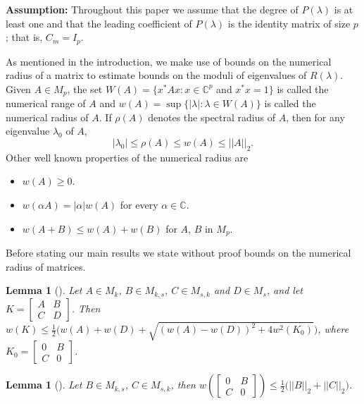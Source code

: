 \documentclass[12pt, reqno]{amsart}
\newtheorem{lemma}[theorem]{Lemma}
\theoremstyle{definition}
\theoremstyle{remark}
\numberwithin{equation}{section}
\begin{document}
\noindent 
\textbf{Assumption:} Throughout this paper we assume that the degree of 
$P(\lambda)$ is at least one and that the leading coefficient of $P(\lambda)$ is 
the identity matrix of size $p$; that is, $C_m=I_p$. 

\medskip
As mentioned in the introduction, we make use of bounds on the numerical radius of a matrix 
to estimate bounds on the moduli of eigenvalues of $R(\lambda)$. Given $A \in M_p$, the set 
$W(A) = \{ x^*Ax : x \in \mathbb{C}^p$ and  $x^*x=1\}$ is called the numerical range of 
$A$ and $w(A) = \sup \{ |\lambda| : \lambda \in W(A) \}$ is called the numerical radius 
of $A$. If $\rho(A)$ denotes the spectral radius of $A$, then for any eigenvalue $\lambda_0$ 
of $A$, 
\begin{equation}\label{numerical radius-relationship}
|\lambda_0| \leq \rho(A) \leq w(A) \leq ||A||_2.
\end{equation}
Other well known properties of the numerical radius are  
\begin{itemize}
\item $w(A) \geq 0$.
\item $w(\alpha A) = |\alpha| w(A)$ for every $\alpha \in \mathbb{C}$.
\item $w(A+B) \leq w(A)+w(B)$ for $A$, $B$ in $M_p$. 
\end{itemize}

\medskip
Before stating our main results we state without proof bounds on the numerical radius 
of matrices.

\begin{lemma}[\cite{Abu-Omar}] \label{Lem-numerical radius-1}
Let $A \in M_k$, $B \in M_{k,s}$, $C \in M_{s,k}$ and $D \in M_{s}$, and 
let $K = \begin{bmatrix}
A & B \\
C & D
\end{bmatrix}$. Then 
$w(K) \leq \displaystyle \frac{1}{2} \Big(w(A)+ w(D) +\sqrt{(w(A)-w(D))^2+ 4w^2(K_0)}\Big)$,
where $K_0 = \begin{bmatrix}
0 & B \\
C & 0
\end{bmatrix}$. 
\end{lemma}

\begin{lemma}[\cite{Yamazaki}]\label{Lem-numerical radius-2}
Let $B \in M_{k,s}$, $C \in M_{s,k}$, then
$\displaystyle w\left(\begin{bmatrix}
0 & B \\
C & 0
\end{bmatrix}\right) \leq \frac{1}{2}\big(||B||_2+ ||C||_2 \big)$.
\end{lemma}
\end{document}
